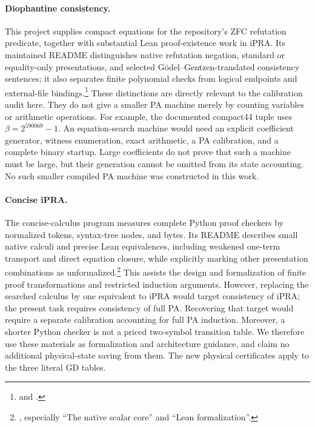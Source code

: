 \paragraph{Diophantine consistency.}
This project supplies compact equations for the repository's ZFC
refutation predicate, together with substantial Lean proof-existence
work in iPRA. Its maintained README distinguishes native refutation
negation, standard or equality-only presentations, and selected
G\"odel--Gentzen-translated consistency sentences; it also separates
finite polynomial checks from logical endpoints and external-file
bindings.\footnote{\raggedright{}
and .}
These distinctions are directly relevant to the calibration audit here.
They do not give a smaller PA machine merely by counting variables or
arithmetic operations. For example, the documented compact44 tuple uses
$\beta=2^{590069}-1$. An equation-search machine would need an explicit
coefficient generator, witness enumeration, exact arithmetic, a PA
calibration, and a complete binary startup. Large coefficients do not
prove that such a machine must be large, but their generation cannot be
omitted from its state accounting. No such smaller compiled PA machine
was constructed in this work.

\paragraph{Concise iPRA.}
The concise-calculus program measures complete Python proof checkers by
normalized tokens, syntax-tree nodes, and bytes. Its README describes
small native calculi and precise Lean equivalences, including weakened
one-term transport and direct equation closure, while explicitly marking
other presentation combinations as unformalized.\footnote{\raggedright{},
especially ``The native scalar core'' and ``Lean formalization''.}
This assists the design and formalization of finite proof transformations
and restricted induction arguments. However, replacing the searched
calculus by one equivalent to iPRA would target consistency of iPRA;
the present task requires consistency of full PA. Recovering that target
would require a separate calibration accounting for full PA induction.
Moreover, a shorter Python checker is not a priced two-symbol
transition table. We therefore use these materials as formalization and
architecture guidance, and claim no additional physical-state saving
from them. The new physical certificates apply to the three literal GD tables.

